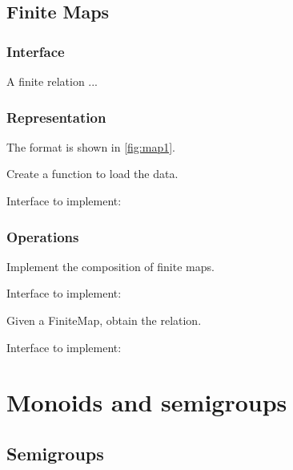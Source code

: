 \section{Finite Maps}

\subsection{Interface}

A finite relation  ...


\subsection{Representation}

The format is shown in \cref{fig:map1}.


\begin{exercise}[Representation]
  Create a function to load the data.

  Interface to implement:
%

\end{exercise}

\subsection{Operations}


\begin{exercise}[Composition]
  Implement the composition of finite maps.

  Interface to implement:
%

\end{exercise}


\begin{exercise}
  Given a FiniteMap, obtain the relation.

  Interface to implement:
%

\end{exercise}


\chapter{Monoids and semigroups}



\section{Semigroups}

